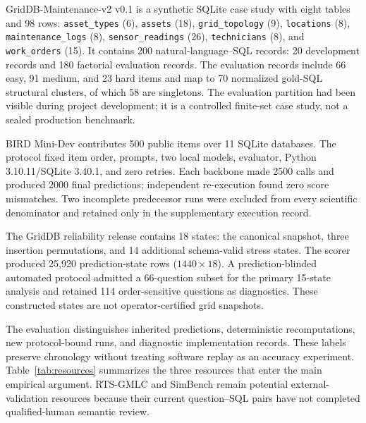 \documentclass[information,article,submit,moreauthors]{Definitions/mdpi}
\begin{document}
GridDB-Maintenance-v2 v0.1 is a synthetic SQLite case study with eight tables and 98 rows: \texttt{asset\_types} (6), \texttt{assets} (18), \texttt{grid\_topology} (9), \texttt{locations} (8), \texttt{maintenance\_logs} (8), \texttt{sensor\_readings} (26), \texttt{technicians} (8), and \texttt{work\_orders} (15). It contains 200 natural-language--SQL records: 20 development records and 180 factorial evaluation records. The evaluation records include 66 easy, 91 medium, and 23 hard items and map to 70 normalized gold-SQL structural clusters, of which 58 are singletons. The evaluation partition had been visible during project development; it is a controlled finite-set case study, not a sealed production benchmark.

BIRD Mini-Dev contributes 500 public items over 11 SQLite databases. The protocol fixed item order, prompts, two local models, evaluator, Python 3.10.11/SQLite 3.40.1, and zero retries. Each backbone made 2500 calls and produced 2000 final predictions; independent re-execution found zero score mismatches. Two incomplete predecessor runs were excluded from every scientific denominator and retained only in the supplementary execution record.

The GridDB reliability release contains 18 states: the canonical snapshot, three insertion permutations, and 14 additional schema-valid stress states. The scorer produced 25,920 prediction-state rows ($1440\times18$). A prediction-blinded automated protocol admitted a 66-question subset for the primary 15-state analysis and retained 114 order-sensitive questions as diagnostics. These constructed states are not operator-certified grid snapshots.

The evaluation distinguishes inherited predictions, deterministic recomputations, new protocol-bound runs, and diagnostic implementation records. These labels preserve chronology without treating software replay as an accuracy experiment. Table~\ref{tab:resources} summarizes the three resources that enter the main empirical argument. RTS-GMLC and SimBench remain potential external-validation resources because their current question--SQL pairs have not completed qualified-human semantic review.
\end{document}
